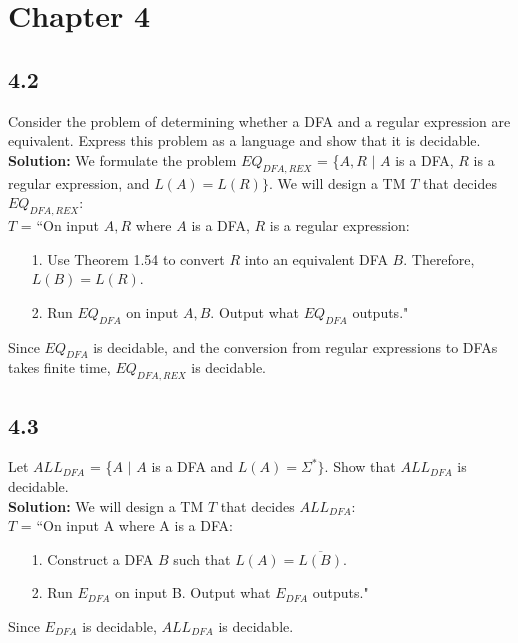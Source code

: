\section{Chapter 4}
\subsection*{4.2} Consider the problem of determining whether a DFA and a regular expression are equivalent. Express this problem as a language and show that it is decidable.
\\
\textbf{Solution:} We formulate the problem $EQ_{DFA,REX}$ = \{\textlangle{}$A, R$\textrangle{} $|$ $A$ is a DFA, $R$ is a regular expression, and $L(A) = L(R)\}$. We will design a TM $T$ that decides $EQ_{DFA,REX}$:
\\
$T$ = ``On input \textlangle{}$A, R$\textrangle{} where $A$ is a DFA, $R$ is a regular expression:
\begin{enumerate}
\itemsep0em
\item[1.]Use Theorem 1.54 to convert $R$ into an equivalent DFA $B$. Therefore, $L(B) = L(R)$.
\item[2.]Run $EQ_{DFA}$ on input \textlangle{}$A, B$\textrangle{}. Output what $EQ_{DFA}$ outputs."
\end{enumerate}
Since $EQ_{DFA}$ is decidable, and the conversion from regular expressions to DFAs takes finite time, $EQ_{DFA,REX}$ is decidable.

\subsection*{4.3} Let $ALL_{DFA}$ = \{\textlangle{}$A$\textrangle{} $|$ $A$ is a DFA and $L(A) = \Sigma^*\}$. Show that $ALL_{DFA}$ is decidable.
\\
\textbf{Solution:} We will design a TM $T$ that decides $ALL_{DFA}$:
\\
$T$ = ``On input \textlangle{}A\textrangle{} where A is a DFA:
\begin{enumerate}
\itemsep0em
\item[1.]Construct a DFA $B$ such that $L(A) = \overline{L(B)}$.
\item[2.]Run $E_{DFA}$ on input \textlangle{}B\textrangle{}. Output what $E_{DFA}$ outputs."
\end{enumerate}
Since $E_{DFA}$ is decidable, $ALL_{DFA}$ is decidable.

